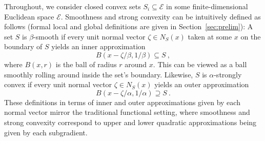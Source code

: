 \documentclass[sn-mathphys,Numbered]{sn-jnl}%
\begin{document}
Throughout, we consider closed convex sets $S_i\subseteq \mathcal{E}$ in some finite-dimensional Euclidean space $\mathcal{E}$. Smoothness and strong convexity can be intuitively defined as follows (formal local and global definitions are given in Section~\ref{sec:prelim}): A set $S$ is $\beta$-smooth if every unit normal vector $\zeta\in N_S(x)$ taken at some $x$ on the boundary of $S$ yields an inner approximation
\begin{equation} \label{eq:inner_approx}
B(x - \zeta/\beta, 1/\beta) \subseteq S \ , 
\end{equation}
where $B(x,r)$ is the ball of radius $r$ around $x$. This can be viewed as a ball smoothly rolling around inside the set's boundary.
Likewise, $S$ is $\alpha$-strongly convex if every unit normal vector $\zeta\in N_S(x)$ yields an outer approximation
\begin{equation} \label{eq:outer_approx}
B(x - \zeta/\alpha, 1/\alpha) \supseteq S \ . 
\end{equation}
These definitions in terms of inner and outer approximations given by each normal vector mirror the traditional functional setting, where smoothness and strong convexity correspond to upper and lower quadratic approximations being given by each subgradient.
\end{document}
